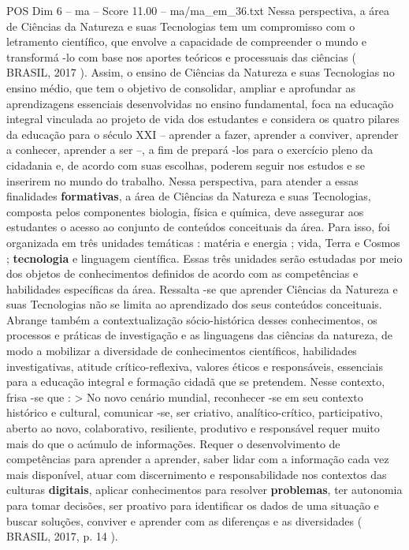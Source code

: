 \begin{textsample}{POS Dim 6 – ma – Score 11.00 – ma/ma\_em\_36.txt}
Nessa perspectiva, a área de Ciências da Natureza e suas Tecnologias tem um compromisso com o letramento científico, que envolve a capacidade de compreender o mundo e transformá -lo com base nos aportes teóricos e processuais das ciências ( BRASIL, 2017 ).
Assim, o ensino de Ciências da Natureza e suas Tecnologias no ensino médio, que tem o objetivo de consolidar, ampliar e aprofundar as aprendizagens essenciais desenvolvidas no ensino fundamental, foca na educação integral vinculada ao projeto de vida dos estudantes e considera os quatro pilares da educação para o século XXI – aprender a fazer, aprender a conviver, aprender a conhecer, aprender a ser –, a fim de prepará -los para o exercício pleno da cidadania e, de acordo com suas escolhas, poderem seguir nos estudos e se inserirem no mundo do trabalho.
Nessa perspectiva, para atender a essas finalidades \textbf{formativas}, a área de Ciências da Natureza e suas Tecnologias, composta pelos componentes biologia, física e química, deve assegurar aos estudantes o acesso ao conjunto de conteúdos conceituais da área.
Para isso, foi organizada em três unidades temáticas : matéria e energia ; vida, Terra e Cosmos ; \textbf{tecnologia} e linguagem científica.
Essas três unidades serão estudadas por meio dos objetos de conhecimentos definidos de acordo com as competências e habilidades específicas da área.
Ressalta -se que aprender Ciências da Natureza e suas Tecnologias não se limita ao aprendizado dos seus conteúdos conceituais.
Abrange também a contextualização sócio-histórica desses conhecimentos, os processos e práticas de investigação e as linguagens das ciências da natureza, de modo a mobilizar a diversidade de conhecimentos científicos, habilidades investigativas, atitude crítico-reflexiva, valores éticos e responsáveis, essenciais para a educação integral e formação cidadã que se pretendem.
Nesse contexto, frisa -se que : > No novo cenário mundial, reconhecer -se em seu contexto histórico e cultural, comunicar -se, ser criativo, analítico-crítico, participativo, aberto ao novo, colaborativo, resiliente, produtivo e responsável requer muito mais do que o acúmulo de informações.
Requer o desenvolvimento de competências para aprender a aprender, saber lidar com a informação cada vez mais disponível, atuar com discernimento e responsabilidade nos contextos das culturas \textbf{digitais}, aplicar conhecimentos para resolver \textbf{problemas}, ter autonomia para tomar decisões, ser proativo para identificar os dados de uma situação e buscar soluções, conviver e aprender com as diferenças e as diversidades ( BRASIL, 2017, p. 14 ).

\end{textsample}
